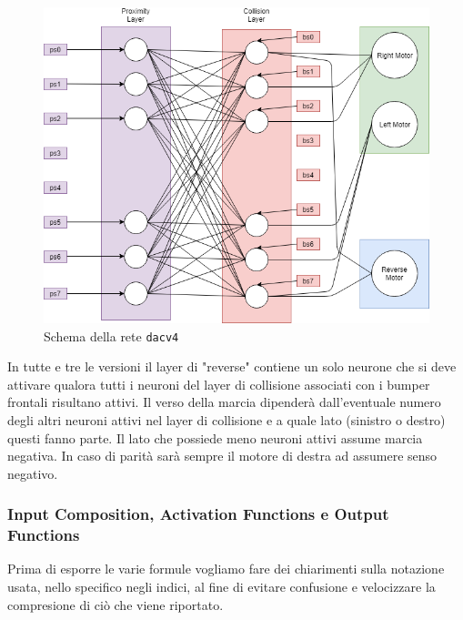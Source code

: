 \begin{figure}[H]
    \centering
    \includegraphics[scale=0.45]{figures/NetVersion4.png}
    \caption{Schema della rete \texttt{dacv4}}
    \label{fig:dacv4}
\end{figure}

In tutte e tre le versioni il layer di "reverse" contiene un solo neurone che si deve attivare qualora tutti i neuroni del layer di collisione associati con i bumper frontali risultano attivi. Il verso della marcia dipenderà dall'eventuale numero degli altri neuroni attivi nel layer di collisione e a quale lato (sinistro o destro) questi fanno parte. Il lato che possiede meno neuroni attivi assume marcia negativa. In caso di parità sarà sempre il motore di destra ad assumere senso negativo.


\subsubsection{Input Composition, Activation  Functions e Output Functions}

Prima di esporre le varie formule vogliamo fare dei chiarimenti sulla notazione usata, nello specifico negli indici, al fine di evitare confusione e velocizzare la compresione di ciò che viene riportato.

